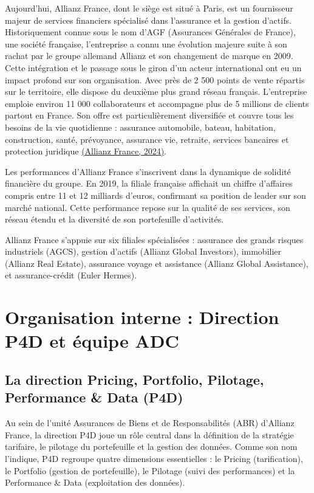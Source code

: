 Aujourd'hui, Allianz France, dont le siège est situé à Paris, est un fournisseur majeur de services financiers spécialisé dans l'assurance et la gestion d'actifs. Historiquement connue sous le nom d'AGF (Assurances Générales de France), une société française, l'entreprise a connu une évolution majeure suite à son rachat par le groupe allemand Allianz et son changement de marque en 2009. Cette intégration et le passage sous le giron d'un acteur international ont eu un impact profond sur son organisation. Avec près de 2 500 points de vente répartis sur le territoire, elle dispose du deuxième plus grand réseau français. L'entreprise emploie environ 11 000 collaborateurs et accompagne plus de 5 millions de clients partout en France. Son offre est particulièrement diversifiée et couvre tous les besoins de la vie quotidienne : assurance automobile, bateau, habitation, construction, santé, prévoyance, assurance vie, retraite, services bancaires et protection juridique \hyperlink{ref.allianz_france}{(Allianz France, 2024)}.

Les performances d'Allianz France s'inscrivent dans la dynamique de solidité financière du groupe. En 2019, la filiale française affichait un chiffre d'affaires compris entre 11 et 12 milliards d'euros, confirmant sa position de leader sur son marché national. Cette performance repose sur la qualité de ses services, son réseau étendu et la diversité de son portefeuille d'activités.

Allianz France s'appuie sur six filiales spécialisées : assurance des grands risques industriels (AGCS), gestion d'actifs (Allianz Global Investors), immobilier (Allianz Real Estate), assurance voyage et assistance (Allianz Global Assistance), et assurance-crédit (Euler Hermes).

\section{Organisation interne : Direction P4D et équipe ADC}

\subsection{La direction Pricing, Portfolio, Pilotage, Performance \& Data (P4D)}

Au sein de l'unité Assurances de Biens et de Responsabilités (ABR) d'Allianz France, la direction P4D joue un rôle central dans la définition de la stratégie tarifaire, le pilotage du portefeuille et la gestion des données. Comme son nom l'indique, P4D regroupe quatre dimensions essentielles : le Pricing (tarification), le Portfolio (gestion de portefeuille), le Pilotage (suivi des performances) et la Performance \& Data (exploitation des données).

